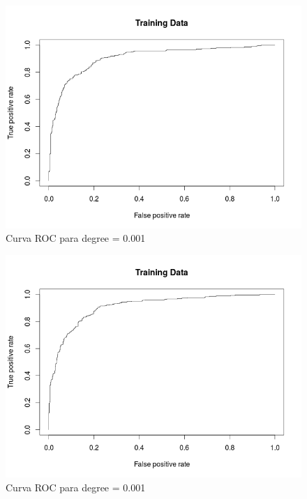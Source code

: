 \begin{figure}[H]
\centering
\includegraphics[scale=0.50]{ej1-63.png}
\caption{Curva ROC para degree = 0.001}
\label{}
\end{figure}

\begin{figure}[H]
\centering
\includegraphics[scale=0.50]{ej1-64.png}
\caption{Curva ROC para degree = 0.001}
\label{}
\end{figure}

